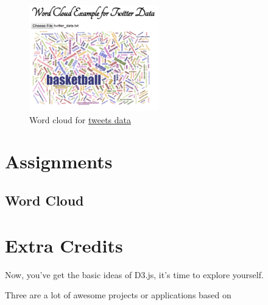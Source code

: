 \documentclass[a4paper, 11pt]{article}
\begin{document}
\begin{figure}[h!]
  \centering
      \includegraphics[width=0.5\textwidth]{word_cloud.png}
  \caption{Word cloud for \href{http://nymph332088.github.io/CIS4340/labassignments/Lab2/twitter_data.txt}{tweets data}}
  \label{fig:wordcloud}
\end{figure}

\section{Assignments}
\subsection{Word Cloud}


\section{Extra Credits}
Now, you've get the basic ideas of D3.js, it's time to explore yourself.

Three are a lot of awesome projects or applications based on 
\end{document}
